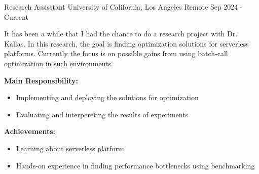 

\begin{cventries}
  \cventry
  {Research Assisstant} %
  {University of California, Los Angeles} %
  {Remote} %
  {Sep 2024 - Current} %
  {
    \begin{cvitems} %
    \item {It has been a while that I had the chance to do a research project
        with Dr. Kallas. In this research, the goal is finding optimization
        solutions for serverless platforms. Currently the focus is on possible
        gains from using batch-call optimization in such environments.}
    \item {\textbf{Main Responsibility:}
        \begin{itemize}[label=-]
        \item Implementing and deploying the solutions for optimization
        \item Evaluating and interpereting the results of experiments
        \end{itemize}
      }
    \item {\textbf{Achievements:}
        \begin{itemize}[label=-]
        \item Learning about serverless platform
        \item Hands-on experience in finding performance bottlenecks using benchmarking
        \end{itemize}
      }
    \end{cvitems}
  }


\end{cventries}
